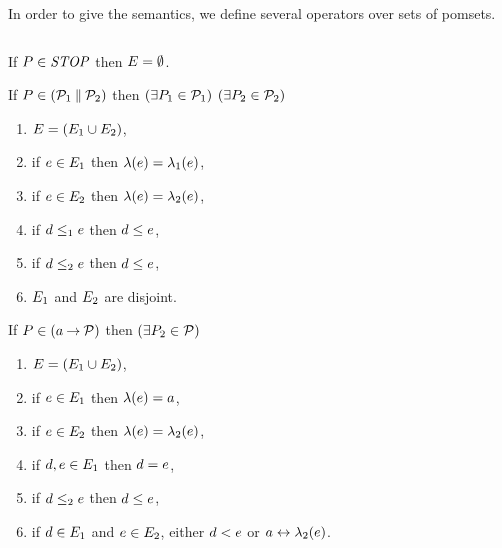 In order to give the semantics, we define several operators over sets of
pomsets.

\begin{definition} $\phantom{\;}$\par
\label{tab:pomsets}

  \noindent
  If $\aPS\SB0\in\sSTOP$ then $\aEvs\SB0 = \emptyset$.

  \noindent
  If $\aPS\SB0 \in (\aPSS_1\sPAR\aPSS_2)$ then  
  $(\exists\aPS_1\in\aPSS_1)$ $(\exists\aPS_2\in\aPSS_2)$
  \begin{enumerate}
  \item $\aEvs\SB0 = (\aEvs_1\cup\aEvs_2)$,
  \item if $\aEv\in\aEvs_1$ then $\labeling\SB0(\aEv) = \labeling_1(\aEv)$, 
  \item if $\aEv\in\aEvs_2$ then $\labeling\SB0(\aEv) = \labeling_2(\aEv)$,
  \item if $\bEv\le_1\aEv$ then $\bEv\le\SB0\aEv$, 
  \item if $\bEv\le_2\aEv$ then $\bEv\le\SB0\aEv$, 
    \setcounter{pomsetParCount}{\value{enumi}}
  \item $\aEvs_1$ and $\aEvs_2$ are disjoint.
    \setcounter{pomsetParDisjointCount}{\value{enumi}}
  \end{enumerate}

  \noindent
  If $\aPS\SB0 \in (\aAct\sPREFIX\aPSS)$ then
  $(\exists\aPS_2\in\aPSS)$
  \begin{enumerate}
  \item $\aEvs\SB0=(\aEvs_1 \cup \aEvs_2)$,
  \item if $\aEv\in\aEvs_1$ then $\labelingAct\SB0(\aEv) = \aAct$,
  \item if $\aEv\in\aEvs_2$ then $\labelingAct\SB0(\aEv) = \labelingAct_2(\aEv)$,
  \item if $\bEv,\aEv\in\aEvs_1$ then $\bEv=\aEv$,
  \item if $\bEv\le_2\aEv$ then $\bEv\le\SB0\aEv$, 
  \item if $\bEv\in\aEvs_1$ and $\aEv\in\aEvs_2$, either $\bEv<\SB0\aEv$ or $a\reorder\labeling_2(\aEv)$.
    \setcounter{pomsetPrefixOrderCount}{\value{enumi}}
  \end{enumerate}
\end{definition}
